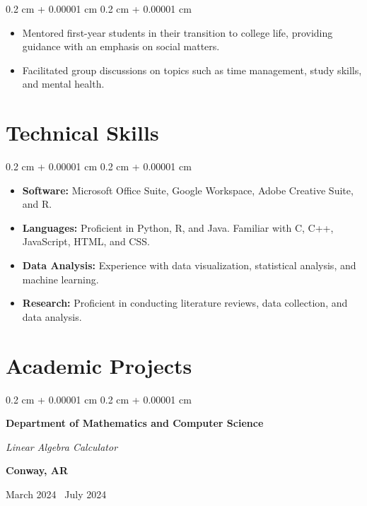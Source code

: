 \documentclass[10pt, letterpaper]{article}
\newenvironment{highlights}{
    \begin{itemize}[
        topsep=0.10 cm,
        parsep=0.10 cm,
        partopsep=0pt,
        itemsep=0pt,
        leftmargin=0.4 cm + 10pt
    ]
}{
    \end{itemize}
} %
\newenvironment{onecolentry}{
    \begin{adjustwidth}{
        0.2 cm + 0.00001 cm
    }{
        0.2 cm + 0.00001 cm
    }
}{
    \end{adjustwidth}
} %
\newenvironment{twocolentry}[2][]{
    \onecolentry
    \def\secondColumn{#2}
    \setcolumnwidth{\fill, 4.5 cm}
    \begin{paracol}{2}
}{
    \switchcolumn \raggedleft \secondColumn
    \end{paracol}
    \endonecolentry
} %
\begin{document}
\vspace{0.10 cm}

\begin{onecolentry}
    \begin{highlights}
        \item Mentored first-year students in their transition to college life, providing guidance with an emphasis on social matters.
        \item Facilitated group discussions on topics such as time management, study skills, and mental health.
    \end{highlights}
\end{onecolentry}



\section{Technical Skills}

\begin{onecolentry}
    \begin{highlights}
        \item \textbf{Software:} Microsoft Office Suite, Google Workspace, Adobe Creative Suite, and R.
        \item \textbf{Languages:} Proficient in Python, R, and Java. Familiar with C, C++, JavaScript, HTML, and CSS.
        \item \textbf{Data Analysis:} Experience with data visualization, statistical analysis, and machine learning.
        \item \textbf{Research:} Proficient in conducting literature reviews, data collection, and data analysis.
    \end{highlights}
\end{onecolentry}

\section{Academic Projects}

\begin{twocolentry}
    {
        \textbf{Conway, AR}

        March 2024 \textendash\ July 2024 
    }
    \textbf{Department of Mathematics and Computer Science}

    \textit{Linear Algebra Calculator}
    
\end{twocolentry}
\end{document}
